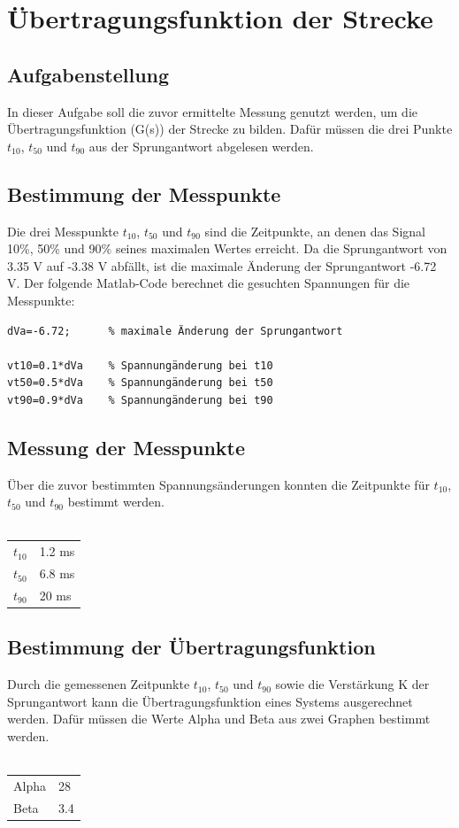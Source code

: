 \documentclass[twoside]{article}
\begin{document}
\newpage
\section{Übertragungsfunktion der Strecke}
\subsection{Aufgabenstellung}
In dieser Aufgabe soll die zuvor ermittelte Messung genutzt werden, um die Übertragungsfunktion (G(s)) der Strecke zu bilden. Dafür müssen die drei Punkte $t_{10}$, $t_{50}$ und $t_{90}$ aus der Sprungantwort abgelesen werden.

\subsection{Bestimmung der Messpunkte}
Die drei Messpunkte $t_{10}$, $t_{50}$ und $t_{90}$ sind die Zeitpunkte, an denen das Signal 10\%, 50\% und 90\% seines maximalen Wertes erreicht. Da die Sprungantwort von 3.35 V auf -3.38 V abfällt, ist die maximale Änderung der Sprungantwort -6.72 V. Der folgende Matlab-Code berechnet die gesuchten Spannungen für die Messpunkte:
\begin{verbatim}
dVa=-6.72;      % maximale Änderung der Sprungantwort

vt10=0.1*dVa    % Spannungänderung bei t10
vt50=0.5*dVa    % Spannungänderung bei t50
vt90=0.9*dVa    % Spannungänderung bei t90
\end{verbatim}

\subsection{Messung der Messpunkte}
Über die zuvor bestimmten Spannungsänderungen konnten die Zeitpunkte für $t_{10}$, $t_{50}$ und $t_{90}$ bestimmt werden.\\\\
\begin{tabular}{ l l }
    $t_{10}$ & 1.2 ms \\
    $t_{50}$ & 6.8 ms \\
    $t_{90}$ & 20 ms \\
\end{tabular}

\subsection{Bestimmung der Übertragungsfunktion}
Durch die gemessenen Zeitpunkte $t_{10}$, $t_{50}$ und $t_{90}$ sowie die Verstärkung K der Sprungantwort kann die Übertragungsfunktion eines Systems ausgerechnet werden. Dafür müssen die Werte Alpha und Beta aus zwei Graphen bestimmt werden.\\\\
\begin{tabular}{ l l }
    Alpha & 28 \\
    Beta & 3.4 \\
\end{tabular}
\end{document}
